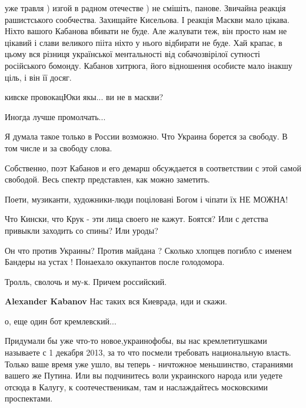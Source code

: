 \begin{itemize}

уже травля ) изгой в радном отечестве ) не смішіть, панове. Звичайна реакція
рашистського сообчества. Захищайте Кисельова. І реакція Маскви мало цікава.
Ніхто вашого Кабанова вбивати не буде. Але жалувати теж, він просто нам не
цікавий і слави великого пііта ніхто у нього відбирати не буде. Хай крапає, в
цьому вся різниця української ментальності від собачозвірілої сутності
російського бомонду. Кабанов хитрюга, його відношення особисте мало інакшу
ціль, і він її досяг.


кивске провокацЮки якы... ви не в маскви?

Иногда лучше промолчать...


Я думала такое только в России возможно. Что Украина борется за свободу. В том
числе и за свободу слова.

\begin{itemize} %
Собственно, поэт Кабанов и его демарш обсуждается в соответствии с этой самой
свободой. Весь спектр представлен, как можно заметить.
\end{itemize} %

Поети, музиканти, художники-люди поціловані Богом і чіпати їх НЕ МОЖНА!

Что Кински, что Крук - эти лица своего не кажут. Боятся? Или с детства привыкли заходить со спины? Или уроды?


Он что против Украины? Против майдана ? Сколько хлопцев погибло с именем
Бандеры на устах ! Понаехало оккупантов после голодомора.

\begin{itemize} %
Тролль, сволочь и му-к. Причем российский.

\textbf{Alexander Kabanov} Нас таких вся Киеврада, иди и скажи.

о, еще один бот кремлевский...


Придумали бы уже что-то новое,украинофобы, вы нас кремлетитушками называете с 1
декабря 2013, за то что посмели требовать национальную власть. Только ваше
время уже ушло, вы теперь - ничтожное меньшинство, стараниями вашего же Путина.
Или вы подчинитесь воли украинского народа или уедете отсюда в Калугу, к
соотечественикам, там и наслаждайтесь московскими проспектами.


\end{itemize}
\end{itemize}
